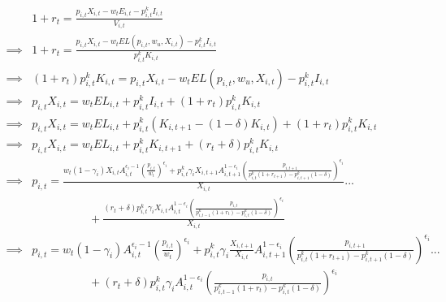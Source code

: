 \documentclass[letterpaper,12pt]{article}
\theoremstyle{definition}
\begin{document}
\begin{spacing}{1.5}
\begin{equation}
\label{eqn:price_det2}
\begin{split}
&  1+r_{t} = \frac{ p_{i,t}X_{i,t} - w_{t}E_{i,t} - p^{k}_{i,t}I_{i,t}}{V_{i,t}} \\
\implies & 1+r_{t} =  \frac{ p_{i,t}X_{i,t} - w_{t}EL(p_{i,t},w_{u},X_{i,t}) - p^{k}_{i,t}I_{i,t}}{p^{k}_{i,t}K_{i,t}} \\
\implies & (1+r_{t})p^{k}_{i,t}K_{i,t} =  p_{i,t}X_{i,t} - w_{t}EL(p_{i,t},w_{u},X_{i,t}) - p^{k}_{i,t}I_{i,t} \\
\implies & p_{i,t}X_{i,t} = w_{t}EL_{i,t} + p^{k}_{i,t}I_{i,t} +  (1+r_{t})p^{k}_{i,t}K_{i,t} \\
\implies & p_{i,t}X_{i,t} = w_{t}EL_{i,t}+ p^{k}_{i,t}(K_{i,t+1} - (1-\delta)K_{i,t}) +  (1+r_{t})p^{k}_{i,t}K_{i,t} \\
\implies & p_{i,t}X_{i,t} = w_{t}EL_{i,t} + p^{k}_{i,t}K_{i,t+1}+  (r_{t}+\delta)p^{k}_{i,t}K_{i,t} \\
\implies & p_{i,t}= \frac{w_{t}(1-\gamma_{i})X_{i,t}A_{i,t}^{\epsilon_{i}-1}\left( \frac{ p_{i,t}}{w_{t}}\right)^{\epsilon_{i}} + p^{k}_{i,t} \gamma_{i}X_{i,t+1}A_{i,t+1}^{1-\epsilon_{i}} \left(\frac{p_{i,t+1}}{p^{k}_{i,t}(1+r_{t+1}) - p^{k}_{i,t+1}(1-\delta)} \right)^{\epsilon_{i}}}{X_{i,t} } ... \\
& \quad\quad\quad\quad\quad + \frac{ (r_{t}+\delta)p^{k}_{i,t}\gamma_{i}X_{i,t}A_{i,t}^{1-\epsilon_{i}} \left(\frac{p_{i,t}}{p^{k}_{i,t-1}(1+r_{t}) - p^{k}_{i,t}(1-\delta)} \right)^{\epsilon_{i}}}{X_{i,t} } \\
\implies & p_{i,t}= w_{t}(1-\gamma_{i})A_{i,t}^{\epsilon_{i}-1}\left( \frac{ p_{i,t}}{w_{t}}\right)^{\epsilon_{i}} + p^{k}_{i,t} \gamma_{i}\frac{X_{i,t+1}}{X_{i,t}}A_{i,t+1}^{1-\epsilon_{i}} \left(\frac{p_{i,t+1}}{p^{k}_{i,t}(1+r_{t+1}) - p^{k}_{i,t+1}(1-\delta)} \right)^{\epsilon_{i}} ... \\
& \quad\quad\quad\quad\quad +  (r_{t}+\delta)p^{k}_{i,t}\gamma_{i}A_{i,t}^{1-\epsilon_{i}} \left(\frac{p_{i,t}}{p^{k}_{i,t-1}(1+r_{t}) - p^{k}_{i,t}(1-\delta)} \right)^{\epsilon_{i}}
\end{split}
\end{equation}

%



\end{spacing}
\end{document}
